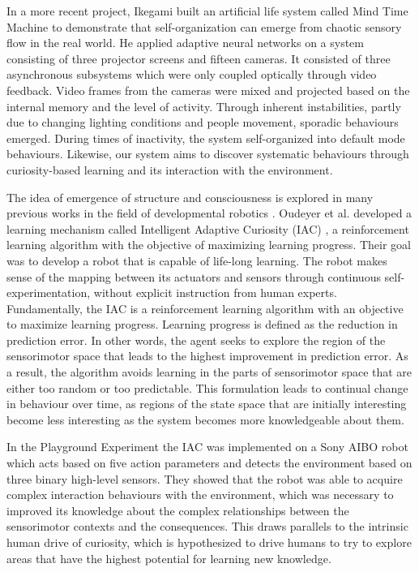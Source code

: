 In a more recent project, Ikegami built an artificial life system called Mind Time Machine \cite{Ikegami2013} to demonstrate that self-organization can emerge from chaotic sensory flow in the real world. He applied adaptive neural networks on a system consisting of three projector screens and fifteen cameras. It consisted of three asynchronous subsystems which were only coupled optically through video feedback. Video frames from the cameras were mixed and projected based on the internal memory and the level of activity. Through inherent instabilities, partly due to changing lighting conditions and people movement, sporadic behaviours emerged. During times of inactivity, the system self-organized into default mode behaviours. Likewise, our system aims to discover systematic behaviours through curiosity-based learning and its interaction with the environment. 

The idea of emergence of structure and consciousness is explored in many previous works in the field of developmental robotics \cite{Lungarella2003}\cite{Asada2009}\cite{Kompella2014}.  
Oudeyer et al. developed a learning mechanism called Intelligent Adaptive Curiosity (IAC) \cite{Oudeyer2007}, a reinforcement learning algorithm with the objective of maximizing learning progress. Their goal was to develop a robot that is capable of life-long learning. The robot makes sense of the mapping between its actuators and sensors through continuous self-experimentation, without explicit instruction from human experts. Fundamentally, the IAC is a reinforcement learning algorithm with an objective to maximize learning progress. Learning progress is defined as the reduction in prediction error. In other words, the agent seeks to explore the region of the sensorimotor space that leads to the highest improvement in prediction error. As a result, the algorithm avoids learning in the parts of sensorimotor space that are either too random or too predictable. This formulation leads to continual change in behaviour over time, as regions of the state space that are initially interesting become less interesting as the system becomes more knowledgeable about them. 

In the Playground Experiment \cite{Oudeyer2005} the IAC was implemented on a Sony AIBO robot which acts based on five action parameters and detects the environment based on three binary high-level sensors. They showed that the robot was able to acquire complex interaction behaviours with the environment, which was necessary to improved its knowledge about the complex relationships between the sensorimotor contexts and the consequences. This draws parallels to the intrinsic human drive of curiosity, which is hypothesized to drive humans to try to explore areas that have the highest potential for learning new knowledge.
 
